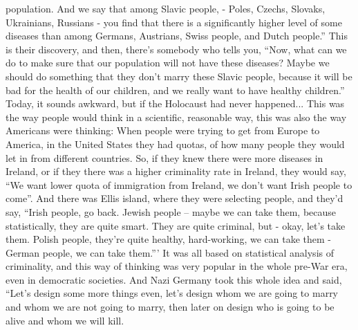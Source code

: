 population. And we say that among Slavic people, - Poles, Czechs, Slovaks, Ukrainians, Russians - you find that there is a significantly higher level of some diseases than among Germans, Austrians, Swiss people, and Dutch people.'' This is their discovery, and then, there’s somebody who tells you, ``Now, what can we do to make sure that our population will not have these diseases? Maybe we should do something that they don’t marry these Slavic people, because it will be bad for the health of our children, and we really want to have healthy children.'' Today, it sounds awkward, but if the Holocaust had never happened... This was the way people would think in a scientific, reasonable way, this was also the way Americans were thinking: When people were trying to get from Europe to America, in the United States they had quotas, of how many people they would let in from different countries. So, if they knew there were more diseases in Ireland, or if they there was a higher criminality rate in Ireland, they would say, ``We want lower quota of immigration from Ireland, we don’t want Irish people to come''. And there was Ellis island, where they were selecting people, and they’d say, ``Irish people, go back. Jewish people – maybe we can take them, because statistically, they are quite smart. They are quite criminal, but - okay, let’s take them. Polish people, they’re quite healthy, hard-working, we can take them - German people, we can take them.''' It was all based on statistical analysis of criminality, and this  way of thinking was very popular in the whole pre-War era, even in democratic societies. And Nazi Germany took this whole idea and said, ``Let’s design some more things even, let’s design whom we are going to marry and whom we are not going to marry, then later on design who is going to be alive and whom we will kill.\\
